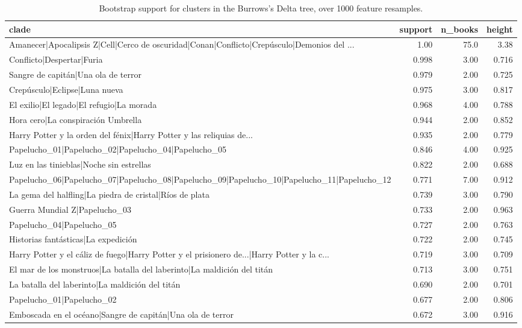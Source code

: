 \begin{table}[htbp]
\centering
\small
\caption{Bootstrap support for clusters in the Burrows's Delta tree, over 1000 feature resamples.}
\label{tab:cluster-support}
\begin{tabular}{lrrr}
\toprule
\textbf{clade} & \textbf{support} & \textbf{n\_books} & \textbf{height} \\
\midrule
Amanecer|Apocalipsis Z|Cell|Cerco de oscuridad|Conan|Conflicto|Crepúsculo|Demonios del ... & 1.00 & 75.0 & 3.38 \\
Conflicto|Despertar|Furia & 0.998 & 3.00 & 0.716 \\
Sangre de capitán|Una ola de terror & 0.979 & 2.00 & 0.725 \\
Crepúsculo|Eclipse|Luna nueva & 0.975 & 3.00 & 0.817 \\
El exilio|El legado|El refugio|La morada & 0.968 & 4.00 & 0.788 \\
Hora cero|La conspiración Umbrella & 0.944 & 2.00 & 0.852 \\
Harry Potter y la orden del fénix|Harry Potter y las reliquias de... & 0.935 & 2.00 & 0.779 \\
Papelucho\_01|Papelucho\_02|Papelucho\_04|Papelucho\_05 & 0.846 & 4.00 & 0.925 \\
Luz en las tinieblas|Noche sin estrellas & 0.822 & 2.00 & 0.688 \\
Papelucho\_06|Papelucho\_07|Papelucho\_08|Papelucho\_09|Papelucho\_10|Papelucho\_11|Papelucho\_12 & 0.771 & 7.00 & 0.912 \\
La gema del halfling|La piedra de cristal|Ríos de plata & 0.739 & 3.00 & 0.790 \\
Guerra Mundial Z|Papelucho\_03 & 0.733 & 2.00 & 0.963 \\
Papelucho\_04|Papelucho\_05 & 0.727 & 2.00 & 0.763 \\
Historias fantásticas|La expedición & 0.722 & 2.00 & 0.745 \\
Harry Potter y el cáliz de fuego|Harry Potter y el prisionero de...|Harry Potter y la c... & 0.719 & 3.00 & 0.709 \\
El mar de los monstruos|La batalla del laberinto|La maldición del titán & 0.713 & 3.00 & 0.751 \\
La batalla del laberinto|La maldición del titán & 0.690 & 2.00 & 0.701 \\
Papelucho\_01|Papelucho\_02 & 0.677 & 2.00 & 0.806 \\
Emboscada en el océano|Sangre de capitán|Una ola de terror & 0.672 & 3.00 & 0.916 \\

\end{tabular}
\end{table}
